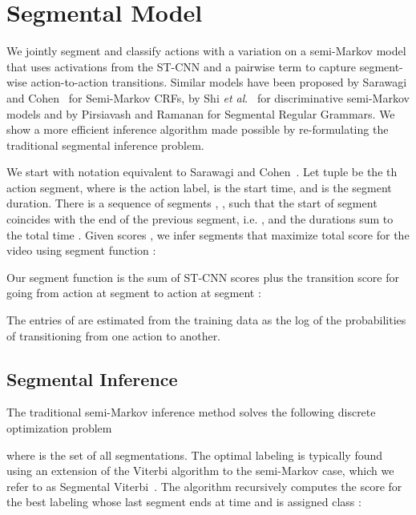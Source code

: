 \documentclass[runningheads]{llncs}
\newcommand{\etal}{\emph{et al}.}
\begin{document}
\section{Segmental Model}
\label{sec:inference}


We jointly segment and classify actions with a variation on a semi-Markov model that uses activations from the ST-CNN and a pairwise term to capture segment-wise action-to-action transitions.
Similar models have been proposed by Sarawagi and Cohen~\cite{sarawagi_nips_2004} for Semi-Markov CRFs, by Shi \etal~\cite{shi_ijcv_2011} for discriminative semi-Markov models and by Pirsiavash and Ramanan \cite{pirsiavash_cvpr_2014} for Segmental Regular Grammars.
We show a more efficient inference algorithm made possible by re-formulating the traditional segmental inference problem. 





We start with notation equivalent to Sarawagi and Cohen~\cite{sarawagi_nips_2004}. Let tuple  be the th action segment, where  is the action label,  is the start time, and  is the segment duration. There is a sequence of  segments , , such that the start of segment  coincides with the end of the previous segment, i.e. , and the durations sum to the total time .
Given scores , we infer segments  that maximize total score  for the video using segment function :

Our segment function is the sum of ST-CNN scores 
plus the transition score for going from action  at segment  to action  at segment :




The entries of  
are estimated from the training data as the log of the probabilities 
of transitioning from one action to another.












\subsection{Segmental Inference}
The traditional semi-Markov inference method 
solves the following discrete optimization problem 

where  is the set of all segmentations.
The optimal labeling is typically found using an extension of the Viterbi algorithm to the semi-Markov case, which we refer to as Segmental Viterbi~\cite{sarawagi_nips_2004,shi_ijcv_2011,pirsiavash_cvpr_2014}.
The algorithm recursively computes the score  for the best labeling whose last segment ends at time  and is assigned class :
\end{document}
